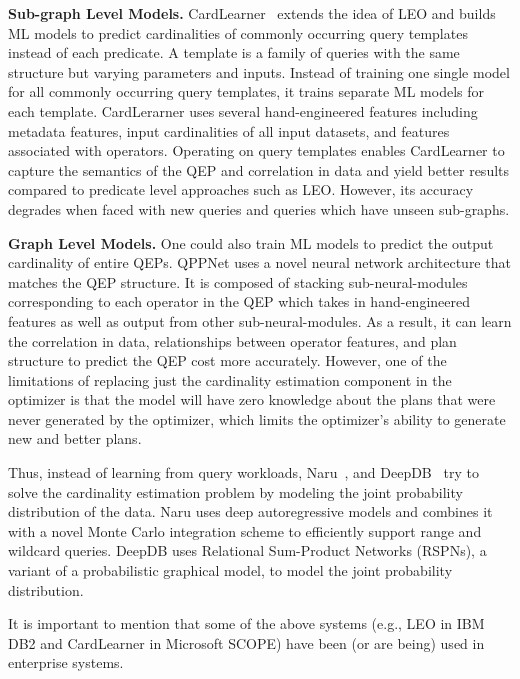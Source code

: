 \vspace{2mm}
\noindent\textbf{Sub-graph Level Models.} CardLearner~\cite{cardlearner} extends the idea of LEO and builds ML models to predict cardinalities of commonly occurring query templates instead of each predicate.
A template is a family of queries with the same structure but varying parameters and inputs.
Instead of training one single model for all commonly occurring query templates, it trains separate ML models for each template.
CardLerarner uses several hand-engineered features including metadata features, input cardinalities of all input datasets, and features associated with operators.
Operating on query templates enables CardLearner to capture the semantics of the QEP and correlation in data and yield better results compared to predicate level approaches such as LEO.
However, its accuracy degrades when faced with new queries and queries which have unseen sub-graphs.


\vspace{2mm}
\noindent \textbf{Graph Level Models.} One could also train ML models to predict the output cardinality of entire QEPs.
QPPNet uses a novel neural network architecture that matches the QEP structure.
It is composed of stacking sub-neural-modules corresponding to each operator in the QEP which takes in hand-engineered features as well as output from other sub-neural-modules.
As a result, it can learn the correlation in data, relationships between operator features, and plan structure to predict the QEP cost more accurately.
However, one of the limitations of replacing just the cardinality estimation component in the optimizer is that the model will have zero knowledge about the plans that were never generated by the optimizer, which limits the optimizer's ability to generate new and better plans.

Thus, instead of learning from query workloads, Naru~\cite{naru}, and DeepDB~\cite{deepdb} try to solve the cardinality estimation problem by modeling the joint probability distribution of the data.
Naru uses deep autoregressive models and combines it with a novel Monte Carlo integration scheme to efficiently support range and wildcard queries.
DeepDB uses Relational Sum-Product Networks (RSPNs), a variant of a probabilistic graphical model, to model the joint probability distribution.

\vspace{2mm}
It is important to mention that some of the above systems (e.g., LEO in IBM DB2 and CardLearner in Microsoft SCOPE) have been (or are being) used in enterprise systems.


